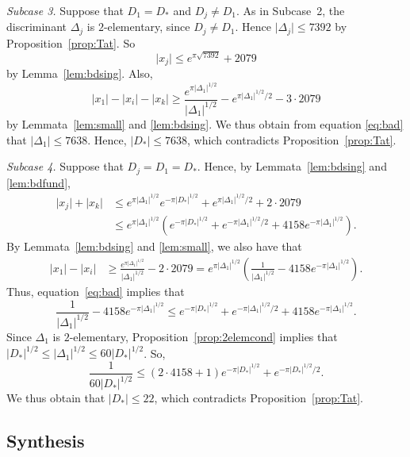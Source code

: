 \documentclass[12pt,a4paper,oneside]{amsart}
\begin{document}
\textit{Subcase 3.} Suppose that $D_1 = D_*$ and $D_j \neq D_1$. 
As in Subcase~2, the discriminant $\Delta_j$ is $2$-elementary, since $D_j \neq D_1$. Hence $\lvert \Delta_j \rvert \leq 7392$ by Proposition~\ref{prop:Tat}. So
\[ \lvert x_j \rvert \leq e^{\pi \sqrt{7392}} + 2079\]
by Lemma~\ref{lem:bdsing}. Also,
\[ \lvert x_1 \rvert - \lvert x_i \rvert - \lvert x_k \rvert \geq \frac{e^{\pi \lvert \Delta_1 \rvert^{1/2}}}{\lvert \Delta_1 \rvert^{1/2}} - e^{\pi \lvert \Delta_1 \rvert^{1/2}/2} -3 \cdot 2079\]
by Lemmata~\ref{lem:small} and \ref{lem:bdsing}. We thus obtain from equation \eqref{eq:bad} that $\lvert \Delta_1 \rvert \leq 7638$. Hence, $\lvert D_* \rvert \leq 7638$, which contradicts Proposition~\ref{prop:Tat}. 




\textit{Subcase 4.} Suppose that $D_j = D_1 = D_*$. 
Hence, by Lemmata~\ref{lem:bdsing} and \ref{lem:bdfund},
\begin{align*}
	 \lvert x_j \rvert + \lvert x_k \rvert &\leq e^{\pi \lvert \Delta_1 \rvert^{1/2}} e^{- \pi \lvert D_* \rvert^{1/2}} + e^{\pi \lvert \Delta_1 \rvert^{1/2}/2} + 2 \cdot 2079\\
	 &\leq e^{\pi \lvert \Delta_1 \rvert^{1/2}} (e^{- \pi \lvert D_* \rvert^{1/2}} + e^{- \pi \lvert \Delta_1 \rvert^{1/2}/2} + 4158 e^{- \pi \lvert \Delta_1 \rvert^{1/2}}).
	 \end{align*}
 By Lemmata~\ref{lem:bdsing} and \ref{lem:small}, we also have that
\begin{align*}
	 \lvert x_1 \rvert - \lvert x_i \rvert &\geq \frac{e^{\pi \lvert \Delta_1 \rvert^{1/2}}}{\lvert \Delta_1 \rvert^{1/2}} - 2 \cdot 2079 = e^{\pi \lvert \Delta_1 \rvert^{1/2}} \left(\frac{1}{\lvert \Delta_1 \rvert^{1/2}} -4158 e^{-\pi \lvert \Delta_1 \rvert^{1/2}}\right).
	 \end{align*}
 Thus, equation~\eqref{eq:bad} implies that
 \[\frac{1}{\lvert \Delta_1 \rvert^{1/2}} -4158 e^{-\pi \lvert \Delta_1 \rvert^{1/2}} \leq e^{- \pi \lvert D_* \rvert^{1/2}} + e^{- \pi \lvert \Delta_1 \rvert^{1/2}/2} + 4158 e^{- \pi \lvert \Delta_1 \rvert^{1/2}}.\]
 Since $\Delta_1$ is $2$-elementary, Proposition~\ref{prop:2elemcond} implies that $ \lvert D_* \rvert^{1/2} \leq \lvert \Delta_1 \rvert^{1/2} \leq 60 \lvert D_* \rvert^{1/2}$. So,
 \[ \frac{1}{60 \lvert D_* \rvert^{1/2}} \leq (2 \cdot 4158 +1) e^{- \pi \lvert D_* \rvert^{1/2}} + e^{- \pi \lvert D_* \rvert^{1/2}/2}. \]
 We thus obtain that $\lvert D_* \rvert \leq 22$, which contradicts Proposition~\ref{prop:Tat}. 


\subsection{Synthesis}\label{Subsec:synthesis}
\end{document}
